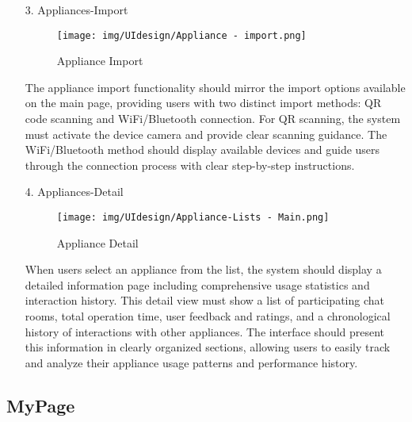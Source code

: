 \documentclass[conference]{IEEEtran}
\begin{document}
\begin{enumerate}
    \item[3.] Appliances-Import
    \begin{figure}[h]
\hspace{1.5cm}
\centering
\begin{minipage}{0.3\columnwidth}
    \texttt{[image: img/UIdesign/Appliance - import.png]}
    \caption{Appliance Import}
\end{minipage}
\end{figure}

    The appliance import functionality should mirror the import options available on the main page, providing users with two distinct import methods: QR code scanning and WiFi/Bluetooth connection. For QR scanning, the system must activate the device camera and provide clear scanning guidance. The WiFi/Bluetooth method should display available devices and guide users through the connection process with clear step-by-step instructions. \\ 
\end{enumerate}

\begin{enumerate}
    \item[4.] Appliances-Detail
    \begin{figure}[h]
\hspace{1.5cm}
\centering
\begin{minipage}{0.4\columnwidth}
    \texttt{[image: img/UIdesign/Appliance-Lists - Main.png]}
    \caption{Appliance Detail}
\end{minipage}
\end{figure} 

    When users select an appliance from the list, the system should display a detailed information page including comprehensive usage statistics and interaction history. This detail view must show a list of participating chat rooms, total operation time, user feedback and ratings, and a chronological history of interactions with other appliances. The interface should present this information in clearly organized sections, allowing users to easily track and analyze their appliance usage patterns and performance history. \\ 
\end{enumerate}

    
\subsection{MyPage}
\end{document}
